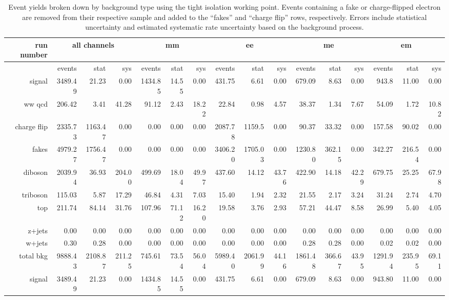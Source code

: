 \begin{sidewaystable}[!htbp]
  {\scriptsize
    \begin{tabular}{r|rrr|rrr|rrr|rrr|rrr}
      run number&\multicolumn{3}{c|}{all channels}&\multicolumn{3}{c|}{mm}&\multicolumn{3}{c|}{ee}&\multicolumn{3}{c|}{me}&\multicolumn{3}{c}{em}\\
      \hline
      &events&stat&sys&events&stat&sys&events&stat&sys&events&stat&sys&events&stat&sys\\
      \hline\hline
      signal&3489.49&21.23&0.00&1434.85&14.55&0.00&431.75&6.61&0.00&679.09&8.63&0.00&943.8&11.00&0.00\\

      ww qcd&206.42&3.41&41.28&91.12&2.43&18.22&22.84&0.98&4.57&38.37&1.34&7.67&54.09&1.72&10.82\\

      charge flip&2335.73&1163.47&0.00&0.00&0.00&0.00&2087.78&1159.5&0.00&90.37&33.32&0.00&157.58&90.02&0.00\\

      fakes&4979.27&1756.47&0.00&0.00&0.00&0.00&3406.20&1705.03&0.00&1230.80&362.15&0.00&342.27&216.54&0.00\\

      diboson&2039.94&36.93&204.00&499.69&18.04&49.97&437.60&14.12&43.76&422.90&14.18&42.29&679.75&25.25&67.98\\

      triboson&115.03&5.87&17.29&46.84&4.31&7.03&15.40&1.94&2.32&21.55&2.17&3.24&31.24&2.74&4.70\\

      top&211.74&84.14&31.76&107.96&71.12&16.20&19.58&3.76&2.93&57.21&44.47&8.58&26.99&5.40&4.05\\

      z+jets&0.00&0.00&0.00&0.00&0.00&0.00&0.00&0.00&0.00&0.00&0.00&0.00&0.00&0.00&0.00\\

      w+jets&0.30&0.28&0.00&0.00&0.00&0.00&0.00&0.00&0.00&0.28&0.28&0.00&0.02&0.02&0.00\\
      \hline
      total bkg&9888.43&2108.87&211.25&745.61&73.54&56.04&5989.40&2061.99&44.16&1861.48&366.67&43.95&1291.94&235.95&69.11\\
      signal&3489.49&21.23&0.00&1434.85&14.55&0.00&431.75&6.61&0.00&679.09&8.63&0.00&943.80&11.00&0.00\\
      \hline\hline
    \end{tabular}
  }
  \caption{Event yields broken down by background type using the tight isolation working point.  Events containing a fake or charge-flipped electron are removed from their respective sample and added to the ``fakes'' and ``charge flip'' rows, respectively.  Errors include statistical uncertainty and estimated systematic rate uncertainty based on the background process.}
  \label{tab:EY_tight}
\end{sidewaystable}
